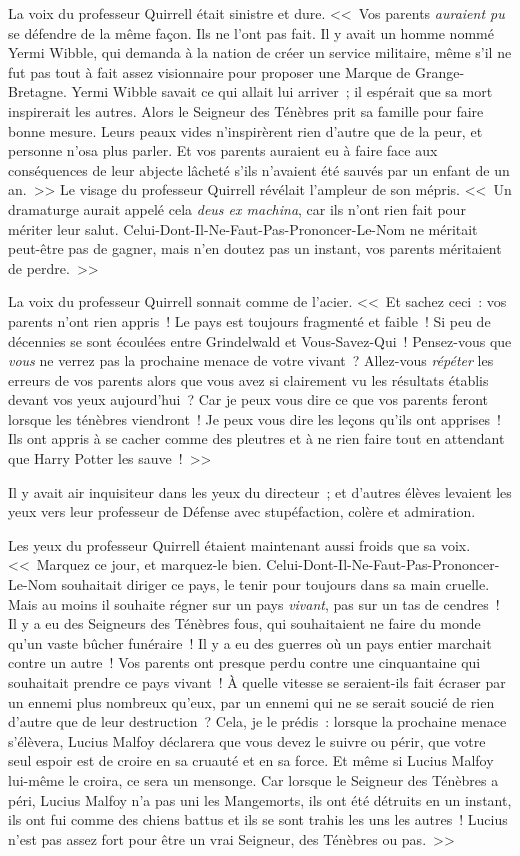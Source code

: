 La voix du professeur Quirrell était sinistre et dure. <<~Vos parents \emph{auraient pu} se défendre de la même façon. Ils ne l'ont pas fait. Il y avait un homme nommé Yermi Wibble, qui demanda à la nation de créer un service militaire, même s'il ne fut pas tout à fait assez visionnaire pour proposer une Marque de Grange-Bretagne. Yermi Wibble savait ce qui allait lui arriver~; il espérait que sa mort inspirerait les autres. Alors le Seigneur des Ténèbres prit sa famille pour faire bonne mesure. Leurs peaux vides n'inspirèrent rien d'autre que de la peur, et personne n'osa plus parler. Et vos parents auraient eu à faire face aux conséquences de leur abjecte lâcheté s'ils n'avaient été sauvés par un enfant de un an.~>> Le visage du professeur Quirrell révélait l'ampleur de son mépris. <<~Un dramaturge aurait appelé cela \emph{deus ex machina}, car ils n'ont rien fait pour mériter leur salut. Celui-Dont-Il-Ne-Faut-Pas-Prononcer-Le-Nom ne méritait peut-être pas de gagner, mais n'en doutez pas un instant, vos parents méritaient de perdre.~>>

La voix du professeur Quirrell sonnait comme de l'acier. <<~Et sachez ceci~: vos parents n'ont rien appris~! Le pays est toujours fragmenté et faible~! Si peu de décennies se sont écoulées entre Grindelwald et Vous-Savez-Qui~! Pensez-vous que \emph{vous} ne verrez pas la prochaine menace de votre vivant~? Allez-vous \emph{répéter} les erreurs de vos parents alors que vous avez si clairement vu les résultats établis devant vos yeux aujourd'hui~? Car je peux vous dire ce que vos parents feront lorsque les ténèbres viendront~! Je peux vous dire les leçons qu'ils ont apprises~! Ils ont appris à se cacher comme des pleutres et à ne rien faire tout en attendant que Harry Potter les sauve~!~>>

Il y avait air inquisiteur dans les yeux du directeur~; et d'autres élèves levaient les yeux vers leur professeur de Défense avec stupéfaction, colère et admiration.

Les yeux du professeur Quirrell étaient maintenant aussi froids que sa voix. <<~Marquez ce jour, et marquez-le bien. Celui-Dont-Il-Ne-Faut-Pas-Prononcer-Le-Nom souhaitait diriger ce pays, le tenir pour toujours dans sa main cruelle. Mais au moins il souhaite régner sur un pays \emph{vivant}, pas sur un tas de cendres~! Il y a eu des Seigneurs des Ténèbres fous, qui souhaitaient ne faire du monde qu'un vaste bûcher funéraire~! Il y a eu des guerres où un pays entier marchait contre un autre~! Vos parents ont presque perdu contre une cinquantaine qui souhaitait prendre ce pays vivant~! À quelle vitesse se seraient-ils fait écraser par un ennemi plus nombreux qu'eux, par un ennemi qui ne se serait soucié de rien d'autre que de leur destruction~? Cela, je le prédis~: lorsque la prochaine menace s'élèvera, Lucius Malfoy déclarera que vous devez le suivre ou périr, que votre seul espoir est de croire en sa cruauté et en sa force. Et même si Lucius Malfoy lui-même le croira, ce sera un mensonge. Car lorsque le Seigneur des Ténèbres a péri, Lucius Malfoy n'a pas uni les Mangemorts, ils ont été détruits en un instant, ils ont fui comme des chiens battus et ils se sont trahis les uns les autres~! Lucius n'est pas assez fort pour être un vrai Seigneur, des Ténèbres ou pas.~>>

